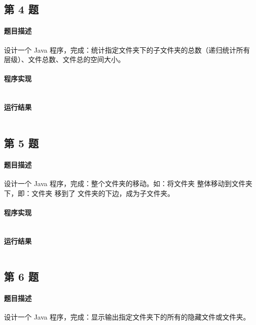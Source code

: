 \documentclass{academics}
\begin{document}
\subsection{第 4 题}

\paragraph{题目描述} {
    设计一个 Java 程序，完成：统计指定文件夹下的子文件夹的总数（递归统计所有层级）、文件总数、文件总的空间大小。
}

\paragraph{程序实现} {
    \inputminted[label=FolderStats.java]{java}{../src/P04/FolderStats.java}
}

\paragraph{运行结果} {
    \inputminted{text}{../res/P04.out}
}

\subsection{第 5 题}

\paragraph{题目描述} {
    设计一个 Java 程序，完成：整个文件夹的移动。如：将文件夹  整体移动到文件夹  下，即：文件夹  移到了  文件夹的下边，成为子文件夹。
}

\paragraph{程序实现} {
    \inputminted[label=FolderMove.java]{java}{../src/P05/FolderMove.java}
}

\paragraph{运行结果} {
    \inputminted{text}{../res/P05.out}
}

\subsection{第 6 题}

\paragraph{题目描述} {
    设计一个 Java 程序，完成：显示输出指定文件夹下的所有的隐藏文件或文件夹。
}
\end{document}
